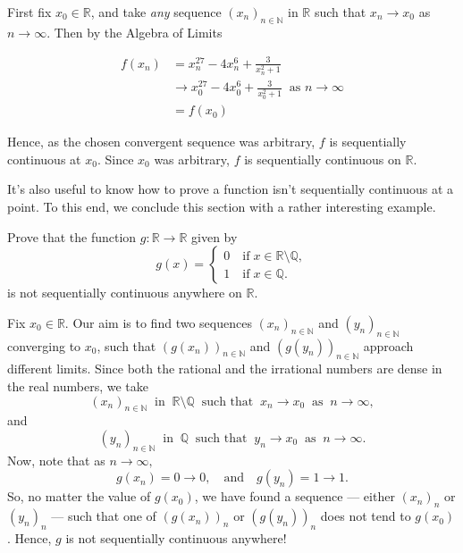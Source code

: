 \documentclass[
  10pt,
  a4paper]{article}
\theoremstyle{plain}
\theoremstyle{plain}
\theoremstyle{plain}
\theoremstyle{plain}
\theoremstyle{plain}
\theoremstyle{definition}
\theoremstyle{definition}
\theoremstyle{definition}
\theoremstyle{remark}
\let\BeginKnitrBlock\begin \let\EndKnitrBlock\end
\begin{document}
\BeginKnitrBlock{solution*}
First fix \(x_0 \in \mathbb{R}\), and take \emph{any} sequence \((x_n)_{n\in\mathbb{N}}\) in \(\mathbb{R}\) such that \(x_n \to x_0\) as \(n \to \infty\). Then by the Algebra of Limits

\begin{align*}
f(x_n) &= x_n^{27} - 4x_n^{6} + \frac{3}{x_n^2 +1}\\
&\to x_0^{27} - 4x_0^6 + \frac{3}{x_0^2 + 1}\; \; \text{as $n \to \infty$}\\
& = f(x_0) 
\end{align*}

Hence, as the chosen convergent sequence was arbitrary, \(f\) is sequentially continuous at \(x_0\). Since \(x_0\) was arbitrary, \(f\) is sequentially continuous on \(\mathbb{R}\).
\EndKnitrBlock{solution*}

It's also useful to know how to prove a function isn't sequentially continuous at a point. To this end, we conclude this section with a rather interesting example.
\BeginKnitrBlock{example}
{\label{exm:ex2} }Prove that the function \(g: \mathbb{R} \to \mathbb{R}\) given by \[g(x) = \begin{cases}
0 \quad \text{if} \; x \in \mathbb{R}\setminus\mathbb{Q},\\
1 \quad \text{if} \; x \in \mathbb{Q}.
\end{cases}\] is not sequentially continuous anywhere on \(\mathbb{R}\).
\EndKnitrBlock{example}

\BeginKnitrBlock{solution*}
Fix \(x_0 \in \mathbb{R}\). Our aim is to find two sequences \((x_n)_{n\in\mathbb{N}}\) and \((y_n)_{n\in\mathbb{N}}\) converging to \(x_0\), such that \(\left(g(x_n)\right)_{n\in\mathbb{N}}\) and \(\left(g(y_n)\right)_{n\in\mathbb{N}}\) approach different limits. Since both the rational and the irrational numbers are dense in the real numbers, we take \[(x_n)_{n\in\mathbb{N}}\;\; \text{in}\;\; \mathbb{R}\setminus\mathbb{Q} \;\; \text{such that} \;\; x_n \to x_0 \;\; \text{as}\;\; n \to \infty,\] and \[(y_n)_{n\in\mathbb{N}}\;\; \text{in}\;\; \mathbb{Q} \;\; \text{such that} \;\; y_n \to x_0 \;\; \text{as}\;\; n \to \infty.\] Now, note that as \(n \to \infty,\) \[g(x_n) = 0 \to 0, \quad \text{and} \quad g(y_n) = 1 \to 1.\] So, no matter the value of \(g(x_0)\), we have found a sequence --- either \((x_n)_n\) or \((y_n)_n\) --- such that one of \(\left(g(x_n)\right)_n\) or \(\left(g(y_n)\right)_n\) does not tend to \(g(x_0)\). Hence, \(g\) is not sequentially continuous anywhere!
\EndKnitrBlock{solution*}
\end{document}
